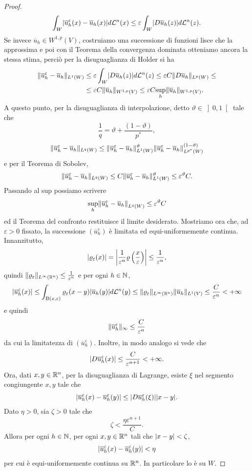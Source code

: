 \begin{proof}
	\[ \int_W \abs{\overline{u}_h^\varepsilon(x) - \overline{u}_h(x)} d\mathcal{L}^n(x)\le \varepsilon \int_{W} \abs{D\overline{u}_h(z)}d\mathcal{L}^n(z). \]
	Se invece $\overline{u}_h \in W^{1,p}(V)$, costruiamo una successione di funzioni lisce che la approssima e poi con il Teorema della convergenza dominata otteniamo ancora la stessa stima, perciò per la disuguaglianza di Holder si ha
	\begin{align*}
		\norm{\overline{u}_h^\varepsilon - \overline{u}_h}_{L^1(W)} &\le \varepsilon \int_{W} \abs{D\overline{u}_h(z)}d\mathcal{L}^n(z) \le \varepsilon C \norm{D\overline{u}_h}_{L^p(W)}\le \\
		&\le \varepsilon C\norm{\overline{u}_h}_{W^{1,p}(V)} \le \varepsilon C\underset{h}{\textup{sup}} \norm{\overline{u}_h}_{W^{1,p}(V)}. 
	\end{align*}
	A questo punto, per la disuguaglianza di interpolazione, detto $\vartheta \in \left] 0,1\right[ $ tale che
	\[ \frac{1}{q} = \vartheta + \frac{(1-\vartheta)}{p^\ast}, \]
	\[  \norm{\overline{u}_h^\varepsilon - \overline{u}_h}_{L^q(W)} \le \norm{\overline{u}_h^\varepsilon - \overline{u}_h}_{L^1(W)}^{\vartheta}\norm{\overline{u}_h^\varepsilon - \overline{u}_h}_{L^{p^\ast}(W)}^{(1-\vartheta)} \]
	e per il Teorema di Sobolev,
	\[ \norm{\overline{u}_h^\varepsilon - \overline{u}_h}_{L^q(W)} \le C \norm{\overline{u}_h^\varepsilon - \overline{u}_h}_{L^1(W)}^{\vartheta} \le \varepsilon^\vartheta C. \]
	Passando al sup possiamo scrivere
	\[ \underset{h}{\textup{sup}}\norm*{\overline{u}_h^\varepsilon -\overline{u}_h}_{L^q(W)} \le \varepsilon^\vartheta C \]
	ed il Teorema del confronto restituisce il limite desiderato. Mostriamo ora che, ad $\varepsilon >0$ fissato, la successione $(\overline{u}_h^\varepsilon)$ è limitata ed equi-uniformemente continua. Innanzitutto, 
	\[ \abs{\varrho_\varepsilon(x)} = \abs*{\frac{1}{\varepsilon^n}\varrho\left( \frac{x}{\varepsilon}\right) } \le \frac{1}{\varepsilon^n}, \]
	quindi $\norm{\varrho_\varepsilon}_{L^\infty(\R^n)} \le \frac{1}{\varepsilon^n}$ e per ogni $h \in \N$,
	\[ \abs{\overline{u}_h^\varepsilon(x)} \le \int_{\textup{B}(x,\varepsilon)} \varrho_\varepsilon(x-y)\abs*{\overline{u}_h(y)}d\mathcal{L}^n(y) \le \norm{\varrho_\varepsilon}_{L^\infty(\R^n)} \norm{\overline{u}_h}_{L^1(V)} \le \frac{C}{\varepsilon^n} < +\infty \]
	e quindi 
	\[ \norm{\overline{u}_h^\varepsilon}_\infty \le \frac{C}{\varepsilon^n} \]
	da cui la limitatezza di $(\overline{u}_h^\varepsilon)$. Inoltre, in modo analogo si vede che
	\[ \abs{D\overline{u}_h^\varepsilon(x)} \le \frac{C}{\varepsilon^{n+1}}< +\infty.  \]
	Ora, dati $x,y \in \R^n$, per la disuguaglianza di Lagrange, esiste $\xi$ nel segmento congiungente $x,y$ tale che
	\[ \abs{\overline{u}_h^\varepsilon(x)- \overline{u}_h^\varepsilon(y)} \le \abs{D\overline{u}_h^\varepsilon(\xi)} \abs{x-y}. \]
	Dato $\eta >0$, sia $\zeta > 0$ tale che
	\[  \zeta  < \frac{\eta \varepsilon^{n+1}}{C}. \]
	Allora per ogni $h \in \N$, per ogni $x,y \in \R^n$ tali che $\abs{x-y} < \zeta $, 
	\[ \abs{\overline{u}_h^\varepsilon(x)- \overline{u}_h^\varepsilon(y)} < \eta \]
	per cui è equi-uniformemente continua su $\R^n$. In particolare lo è su $W$.
	

\end{proof}
